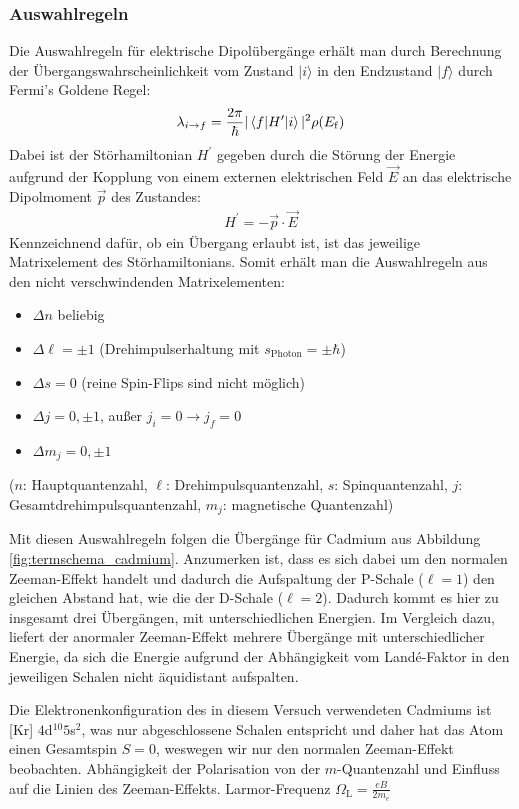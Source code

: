 \documentclass[11pt, a4paper]{article}
\begin{document}
\subsubsection{Auswahlregeln}
\label{sec:auswahlregeln}
Die Auswahlregeln für elektrische Dipolübergänge erhält man durch Berechnung der Übergangswahrscheinlichkeit vom Zustand $|i\rangle$ in den Endzustand $|f\rangle$ durch Fermi's Goldene Regel:
\begin{align}
	\lambda_{i\rightarrow f} = \frac{2 \pi}{\hbar} | \braket{f|H^\prime|i} |^2 \rho(E_\mathrm{f})
\end{align}
Dabei ist der Störhamiltonian $H^\prime$ gegeben durch die Störung der Energie aufgrund der Kopplung von einem externen elektrischen Feld $\vec{E}$ an das elektrische Dipolmoment $\vec{p}$ des Zustandes:
\begin{align}
	H^\prime = - \vec{p} \cdot \vec{E}
\end{align}
Kennzeichnend dafür, ob ein Übergang erlaubt ist, ist das jeweilige Matrixelement des Störhamiltonians.
Somit erhält man die Auswahlregeln aus den nicht verschwindenden Matrixelementen:
\begin{itemize}
	\item $\Delta n$ beliebig
	\item $\Delta \ell = \pm 1$ \quad (Drehimpulserhaltung mit $s_\mathrm{Photon} = \pm \hbar$)
	\item $\Delta s = 0$ \quad (reine Spin-Flips sind nicht möglich)
	\item $\Delta j = 0, \pm 1$, außer $j_i=0 \rightarrow j_f=0$
	\item $\Delta m_j = 0, \pm 1$
\end{itemize}
($n$: Hauptquantenzahl, $\ell$: Drehimpulsquantenzahl, $s$: Spinquantenzahl, $j$: Gesamtdrehimpulsquantenzahl, $m_j$: magnetische Quantenzahl)

Mit diesen Auswahlregeln folgen die Übergänge für Cadmium aus Abbildung \ref{fig:termschema_cadmium}.
Anzumerken ist, dass es sich dabei um den normalen Zeeman-Effekt handelt und dadurch die Aufspaltung der P-Schale ($\ell = 1$) den gleichen Abstand hat, wie die der D-Schale ($\ell = 2$).
Dadurch kommt es hier zu insgesamt drei Übergängen, mit unterschiedlichen Energien.
Im Vergleich dazu, liefert der anormaler Zeeman-Effekt mehrere Übergänge mit unterschiedlicher Energie, da sich die Energie aufgrund der Abhängigkeit vom Landé-Faktor in den jeweiligen Schalen nicht äquidistant aufspalten.

Die Elektronenkonfiguration des in diesem Versuch verwendeten Cadmiums ist [Kr] $4$d$^{10} 5$s$^2$, was nur abgeschlossene Schalen entspricht und daher hat das Atom einen Gesamtspin $S=0$, weswegen wir nur den normalen Zeeman-Effekt beobachten.
Abhängigkeit der Polarisation von der $m$-Quantenzahl und Einfluss auf die Linien des Zeeman-Effekts. Larmor-Frequenz $\Omega_\mathrm{L} = \frac{e B}{2 m_e}$
\end{document}

